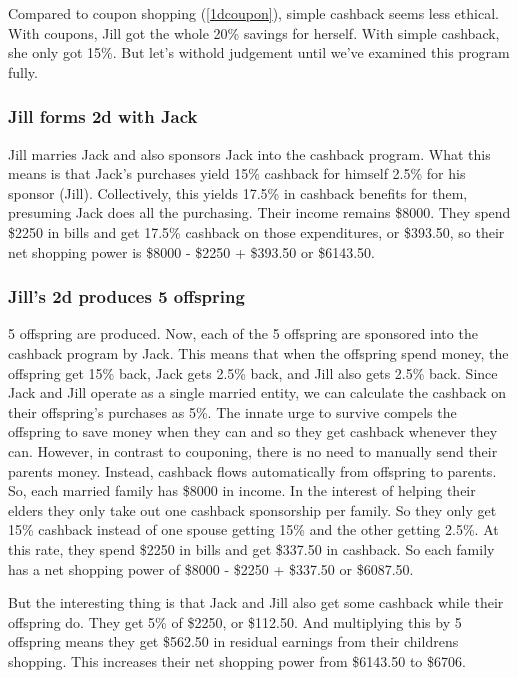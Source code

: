 \documentclass{article}%
\begin{document}
Compared to coupon shopping (\ref{1dcoupon}), simple cashback seems less ethical. With coupons, Jill got the whole 20\% savings for herself. With simple cashback, she only got 15\%. But let's withold judgement until we've examined this program fully.

\subsubsection{Jill forms 2d with Jack}

    Jill marries Jack and also sponsors Jack into the cashback program. What this means is that Jack's purchases yield 15\% cashback for himself 2.5\% for his sponsor (Jill). Collectively, this yields 17.5\% in cashback benefits for them, presuming Jack does all the purchasing. Their income remains \$8000. They spend \$2250 in bills and get 17.5\% cashback on those expenditures, or \$393.50, so their net shopping power is \$8000 - \$2250 + \$393.50 or \$6143.50.

\subsubsection{Jill's 2d produces 5 offspring}

    5 offspring are produced. Now, each of the 5 offspring are sponsored into the cashback program by Jack. This means that when the offspring spend money, the offspring get 15\% back, Jack gets 2.5\% back, and Jill also gets 2.5\% back. Since Jack and Jill operate as a single married entity, we can calculate the cashback on their offspring's purchases as 5\%. The innate urge to survive compels the offspring to save money when they can and so they get cashback whenever they can. However, in contrast to couponing, there is no need to manually send their parents money. Instead, cashback flows automatically from offspring to parents. So, each married family has \$8000 in income. In the interest of helping their elders they only take out one cashback sponsorship per family. So they only get 15\% cashback instead of one spouse getting 15\% and the other getting 2.5\%. At this rate, they spend \$2250 in bills and get \$337.50 in cashback. So each family has a net shopping power of \$8000 - \$2250 + \$337.50 or \$6087.50. 
  
But the interesting thing is that Jack and Jill also get some cashback while their offspring do. They get 5\% of \$2250, or \$112.50. And multiplying this by 5 offspring means they get \$562.50 in residual earnings from their childrens shopping. This increases their net shopping power from \$6143.50 to \$6706.
    
\end{document}
